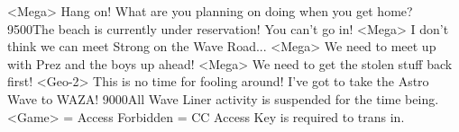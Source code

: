 <Mega> Hang on! What are you planning on doing when you get home? 
{95}{00}The beach is currently under reservation! You can't go in! 
<Mega> I don't think we can meet Strong on the Wave Road... 
<Mega> We need to meet up with Prez and the boys up ahead! 
<Mega> We need to get the stolen stuff back first! 
<Geo-2> This is no time for fooling around! I've got to take the Astro Wave to WAZA! 
{90}{00}All Wave Liner activity is suspended for the time being. 
<Game> = Access Forbidden = CC Access Key is required to trans in. 
